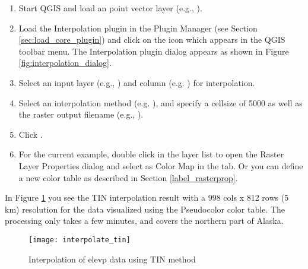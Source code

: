 \begin{enumerate}
  \item Start QGIS and load an point vector layer (e.g., ). 
  \item Load the Interpolation plugin in the Plugin Manager (see Section 
  \ref{sec:load_core_plugin}) and click on the  
  icon which appears in the QGIS toolbar menu. The Interpolation plugin dialog appears as 
  shown in Figure \ref{fig:interpolation_dialog}.
  \item Select an input layer (e.g., ) and column (e.g. ) for 
  interpolation.
  \item Select an interpolation method (e.g. ), and specify a cellsize of 5000 as well as the raster output filename (e.g., ).
  \item Click .
  \item For the current example, double click  in the layer list to open the Raster Layer Properties 
  dialog and select  as Color Map in the  tab. Or you 
  can define a new color table as described in Section \ref{label_rasterprop}.
\end{enumerate}

In Figure \ref{fig:interpolation_idw} you see the TIN interpolation result with a 998 cols x 812 rows (5 km) resolution for the  data visualized using the Pseudocolor color table. The processing only takes a few minutes, and covers the northern part of Alaska.

\begin{figure}[ht]
   \begin{center}
   \caption{Interpolation of elevp data using TIN method \nixcaption}\label{fig:interpolation_idw}\smallskip
   \texttt{[image: interpolate\_tin]}
\end{center}  
\end{figure}

\newpage



